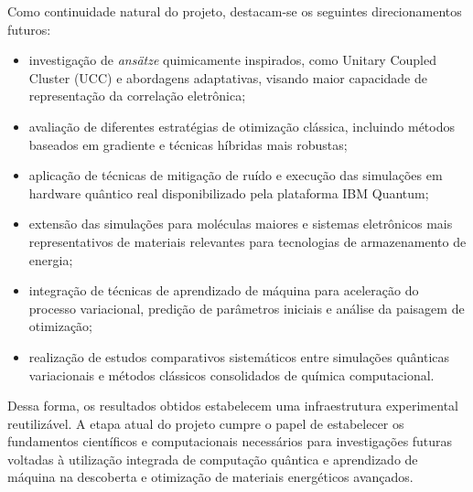 Como continuidade natural do projeto, destacam-se os seguintes 
direcionamentos futuros:
\begin{itemize}
    \item investigação de \textit{ansätze} quimicamente inspirados, como Unitary Coupled Cluster (UCC) e abordagens adaptativas, visando maior capacidade de representação da correlação eletrônica;
    
    \item avaliação de diferentes estratégias de otimização clássica, incluindo métodos baseados em gradiente e técnicas híbridas mais robustas;
    
    \item aplicação de técnicas de mitigação de ruído e execução das simulações em hardware quântico real disponibilizado pela plataforma IBM Quantum;
    
    \item extensão das simulações para moléculas maiores e sistemas eletrônicos mais representativos de materiais relevantes para tecnologias de armazenamento de energia;
    
    \item integração de técnicas de aprendizado de máquina para aceleração do processo variacional, predição de parâmetros iniciais e análise da paisagem de otimização;
    
    \item realização de estudos comparativos sistemáticos entre simulações quânticas variacionais e métodos clássicos consolidados de química computacional.
\end{itemize}
Dessa forma, os resultados obtidos estabelecem uma infraestrutura 
experimental reutilizável. A etapa atual do projeto cumpre o papel de 
estabelecer os fundamentos científicos e computacionais necessários para 
investigações futuras voltadas à utilização integrada de computação quântica 
e aprendizado de máquina na descoberta e otimização de materiais energéticos 
avançados.
